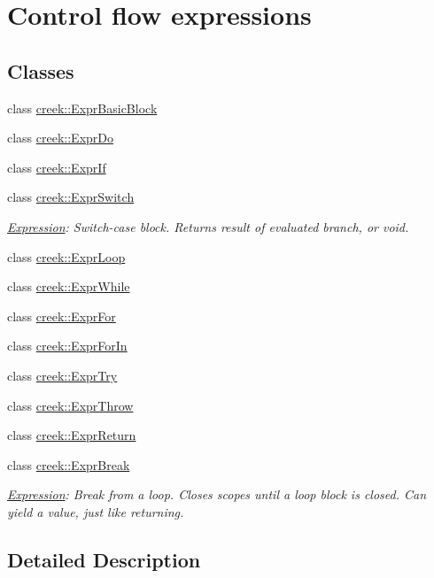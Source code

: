 \hypertarget{group__expression__control__flow}{}\section{Control flow expressions}
\label{group__expression__control__flow}
\subsection*{Classes}
\begin{DoxyCompactItemize}
\item 
class \hyperlink{classcreek_1_1_expr_basic_block}{creek\+::\+Expr\+Basic\+Block}
\item 
class \hyperlink{classcreek_1_1_expr_do}{creek\+::\+Expr\+Do}
\item 
class \hyperlink{classcreek_1_1_expr_if}{creek\+::\+Expr\+If}
\item 
class \hyperlink{classcreek_1_1_expr_switch}{creek\+::\+Expr\+Switch}
\begin{DoxyCompactList}\small\item\em \hyperlink{classcreek_1_1_expression}{Expression}\+: Switch-\/case block. Returns result of evaluated branch, or void. \end{DoxyCompactList}\item 
class \hyperlink{classcreek_1_1_expr_loop}{creek\+::\+Expr\+Loop}
\item 
class \hyperlink{classcreek_1_1_expr_while}{creek\+::\+Expr\+While}
\item 
class \hyperlink{classcreek_1_1_expr_for}{creek\+::\+Expr\+For}
\item 
class \hyperlink{classcreek_1_1_expr_for_in}{creek\+::\+Expr\+For\+In}
\item 
class \hyperlink{classcreek_1_1_expr_try}{creek\+::\+Expr\+Try}
\item 
class \hyperlink{classcreek_1_1_expr_throw}{creek\+::\+Expr\+Throw}
\item 
class \hyperlink{classcreek_1_1_expr_return}{creek\+::\+Expr\+Return}
\item 
class \hyperlink{classcreek_1_1_expr_break}{creek\+::\+Expr\+Break}
\begin{DoxyCompactList}\small\item\em \hyperlink{classcreek_1_1_expression}{Expression}\+: Break from a loop. Closes scopes until a loop block is closed. Can yield a value, just like returning. \end{DoxyCompactList}\end{DoxyCompactItemize}


\subsection{Detailed Description}
